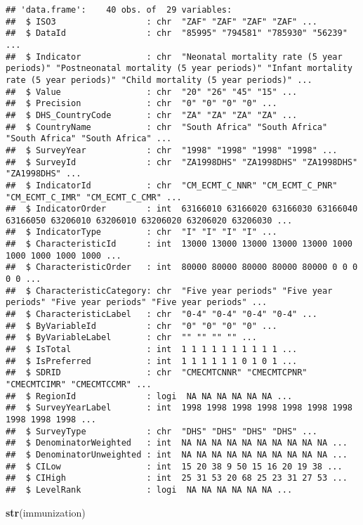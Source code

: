\documentclass[
]{article}
\newenvironment{Shaded}{\begin{snugshade}}{\end{snugshade}}
\newcommand{\FunctionTok}[1]{\textcolor[rgb]{0.13,0.29,0.53}{\textbf{#1}}}
\newcommand{\NormalTok}[1]{#1}
\begin{document}
\begin{verbatim}
## 'data.frame':    40 obs. of  29 variables:
##  $ ISO3                  : chr  "ZAF" "ZAF" "ZAF" "ZAF" ...
##  $ DataId                : chr  "85995" "794581" "785930" "56239" ...
##  $ Indicator             : chr  "Neonatal mortality rate (5 year periods)" "Postneonatal mortality (5 year periods)" "Infant mortality rate (5 year periods)" "Child mortality (5 year periods)" ...
##  $ Value                 : chr  "20" "26" "45" "15" ...
##  $ Precision             : chr  "0" "0" "0" "0" ...
##  $ DHS_CountryCode       : chr  "ZA" "ZA" "ZA" "ZA" ...
##  $ CountryName           : chr  "South Africa" "South Africa" "South Africa" "South Africa" ...
##  $ SurveyYear            : chr  "1998" "1998" "1998" "1998" ...
##  $ SurveyId              : chr  "ZA1998DHS" "ZA1998DHS" "ZA1998DHS" "ZA1998DHS" ...
##  $ IndicatorId           : chr  "CM_ECMT_C_NNR" "CM_ECMT_C_PNR" "CM_ECMT_C_IMR" "CM_ECMT_C_CMR" ...
##  $ IndicatorOrder        : int  63166010 63166020 63166030 63166040 63166050 63206010 63206010 63206020 63206020 63206030 ...
##  $ IndicatorType         : chr  "I" "I" "I" "I" ...
##  $ CharacteristicId      : int  13000 13000 13000 13000 13000 1000 1000 1000 1000 1000 ...
##  $ CharacteristicOrder   : int  80000 80000 80000 80000 80000 0 0 0 0 0 ...
##  $ CharacteristicCategory: chr  "Five year periods" "Five year periods" "Five year periods" "Five year periods" ...
##  $ CharacteristicLabel   : chr  "0-4" "0-4" "0-4" "0-4" ...
##  $ ByVariableId          : chr  "0" "0" "0" "0" ...
##  $ ByVariableLabel       : chr  "" "" "" "" ...
##  $ IsTotal               : int  1 1 1 1 1 1 1 1 1 1 ...
##  $ IsPreferred           : int  1 1 1 1 1 1 0 1 0 1 ...
##  $ SDRID                 : chr  "CMECMTCNNR" "CMECMTCPNR" "CMECMTCIMR" "CMECMTCCMR" ...
##  $ RegionId              : logi  NA NA NA NA NA NA ...
##  $ SurveyYearLabel       : int  1998 1998 1998 1998 1998 1998 1998 1998 1998 1998 ...
##  $ SurveyType            : chr  "DHS" "DHS" "DHS" "DHS" ...
##  $ DenominatorWeighted   : int  NA NA NA NA NA NA NA NA NA NA ...
##  $ DenominatorUnweighted : int  NA NA NA NA NA NA NA NA NA NA ...
##  $ CILow                 : int  15 20 38 9 50 15 16 20 19 38 ...
##  $ CIHigh                : int  25 31 53 20 68 25 23 31 27 53 ...
##  $ LevelRank             : logi  NA NA NA NA NA NA ...
\end{verbatim}

\begin{Shaded}
\begin{Highlighting}[]
\FunctionTok{str}\NormalTok{(immunization)}
\end{Highlighting}
\end{Shaded}
\end{document}
